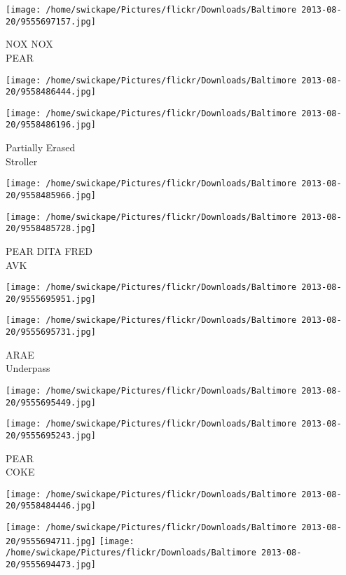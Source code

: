 \documentclass[10pt,letterpaper]{article}
\begin{document}
\vspace{0.25in}
\texttt{[image: /home/swickape/Pictures/flickr/Downloads/Baltimore 2013-08-20/9555697157.jpg]}

NOX NOX\\
PEAR
\pagebreak

\texttt{[image: /home/swickape/Pictures/flickr/Downloads/Baltimore 2013-08-20/9558486444.jpg]}

\vspace{0.25in}
\texttt{[image: /home/swickape/Pictures/flickr/Downloads/Baltimore 2013-08-20/9558486196.jpg]}

Partially Erased\\
Stroller
\pagebreak

\texttt{[image: /home/swickape/Pictures/flickr/Downloads/Baltimore 2013-08-20/9558485966.jpg]}

\vspace{0.25in}
\texttt{[image: /home/swickape/Pictures/flickr/Downloads/Baltimore 2013-08-20/9558485728.jpg]}

PEAR DITA FRED\\
AVK
\pagebreak

\texttt{[image: /home/swickape/Pictures/flickr/Downloads/Baltimore 2013-08-20/9555695951.jpg]}

\vspace{0.25in}
\texttt{[image: /home/swickape/Pictures/flickr/Downloads/Baltimore 2013-08-20/9555695731.jpg]}

ARAE\\
Underpass
\pagebreak

\texttt{[image: /home/swickape/Pictures/flickr/Downloads/Baltimore 2013-08-20/9555695449.jpg]}

\vspace{0.25in}
\texttt{[image: /home/swickape/Pictures/flickr/Downloads/Baltimore 2013-08-20/9555695243.jpg]}

PEAR\\
COKE
\pagebreak

\texttt{[image: /home/swickape/Pictures/flickr/Downloads/Baltimore 2013-08-20/9558484446.jpg]}

\vspace{0.25in}
\texttt{[image: /home/swickape/Pictures/flickr/Downloads/Baltimore 2013-08-20/9555694711.jpg]}
\texttt{[image: /home/swickape/Pictures/flickr/Downloads/Baltimore 2013-08-20/9555694473.jpg]}
\end{document}
